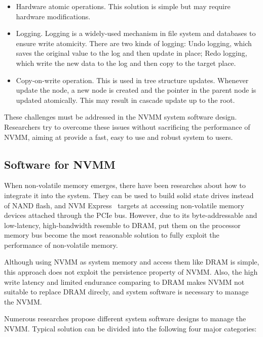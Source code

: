 \begin{itemize}
\item Hardware atomic operations. This solution is simple but may require
hardware modifications.
\item Logging. Logging is a widely-used mechanism in file system and databases
to ensure write atomicity. There are two kinds of logging: Undo logging, which
saves the original value to the log and then update in place; Redo logging,
which write the new data to the log and then copy to the target place.
\item Copy-on-write operation. This is used in tree structure updates. Whenever
update the node, a new node is created and the pointer in the parent node is
updated atomically. This may result in cascade update up to the root.
\end{itemize}

These challenges must be addressed in the NVMM system software design.
Researchers try to overcome these issues without sacrificing the performance
of NVMM, aiming at provide a fast, easy to use and robust system to users.


\subsection{Software for NVMM}
\label{sec:NVMM}

When non-volatile memory emerges, there have been researches about how to
integrate it into the system. They can be used to build solid state drives
instead of NAND flash, and NVM Express~\cite{NVMe} targets at accessing
non-volatile memory devices attached through the PCIe bus. However, due to
its byte-addressable and low-latency, high-bandwidth resemble to DRAM,
put them on the processor memory bus become the most reasonable solution
to fully exploit the performance of non-volatile memory.

Although using NVMM as system memory and access them like DRAM is simple,
this approach does not exploit the persistence property of NVMM. Also, the
high write latency and limited endurance comparing to DRAM makes NVMM not
suitable to replace DRAM direcly, and system software is necessary to
manage the NVMM.

Numerous researches propose different system software designs to
manage the NVMM. Typical solution can be divided into the following
four major categories:

